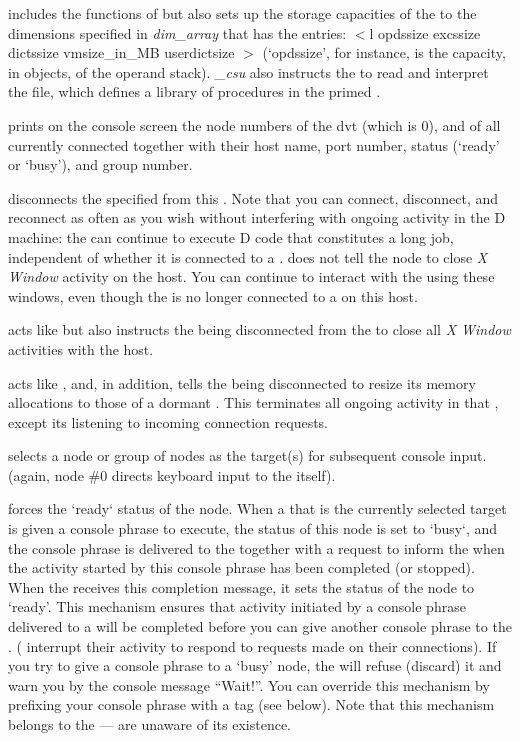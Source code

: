  includes the functions of  but also sets up the
storage capacities of the  to the dimensions specified in
\emph{dim\_array} that has the entries: $<$l opdssize excssize
dictssize vmsize\_in\_MB userdictsize $>$ (`opdssize', for instance,
is the capacity, in objects, of the  operand
stack). \emph{\_csu} also instructs the  to read and
interpret the  file, which defines a library of
procedures in the primed .

 prints on the  console screen the node numbers of
the dvt (which is $0$), and of all currently connected
 together with their host name, port number,
status (`ready' or `busy'), and group number.

 disconnects the specified  from this
. Note that you can connect, disconnect, and reconnect
 as often as you wish without interfering with
ongoing activity in the  D machine: the
 can continue to execute D code that constitutes a long
job, independent of whether it is connected to a
.  does not tell the node to close \emph{X
  Window} activity on the  host. You can continue to
interact with the  using these windows, even though the
 is no longer connected to a  on this host.

 acts like  but also instructs the 
being disconnected from the  to close all \emph{X Window}
activities with the  host.

 acts like , and, in addition, tells the
 being disconnected to resize its memory allocations to
those of a dormant . This terminates all ongoing activity
in that , except its listening to incoming connection
requests.

 selects a node or group of nodes as the target(s) for
subsequent console input. (again, node \#$0$ directs keyboard input to
the  itself).

 forces the `ready` status of the node. When a 
that is the currently selected target is given a console phrase to
execute, the status of this node is set to `busy`, and the console
phrase is delivered to the  together with a request to
inform the  when the activity started by this console
phrase has been completed (or stopped). When the  receives
this completion message, it sets the status of the node to
`ready'. This mechanism ensures that activity initiated by a console
phrase delivered to a  will be completed before you can
give another console phrase to the
. ( interrupt their activity to
respond to requests made on their connections). If you try to give a
console phrase to a `busy' node, the  will refuse (discard)
it and warn you by the console message ``Wait!''. You can override
this mechanism by prefixing your console phrase with a tag (see
below). Note that this mechanism belongs to the  ---
 are unaware of its existence.

